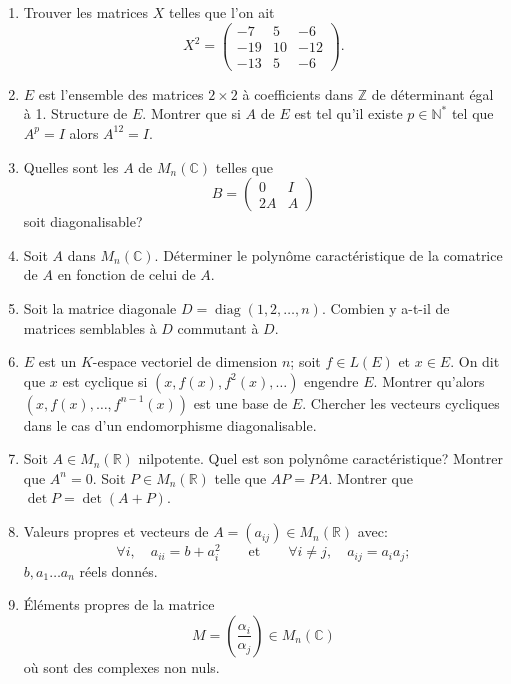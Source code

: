 \begin{enumerate}[label=\arabic*.,leftmargin=2.2em,itemsep=1.0em]
\item Trouver les matrices $X$ telles que l'on ait
\[
X^2=\begin{pmatrix}
-7&5&-6\\
-19&10&-12\\
-13&5&-6
\end{pmatrix}.
\]

\item $E$ est l'ensemble des matrices $2\times2$ à coefficients dans $\mathbb Z$ de déterminant égal à 1. Structure de $E$. Montrer que si $A$ de $E$ est tel qu'il existe $p\in\mathbb N^*$ tel que $A^p=I$ alors $A^{12}=I$.

\item Quelles sont les $A$ de $M_n(\mathbb C)$ telles que
\[
B=\begin{pmatrix}0&I\\2A&A\end{pmatrix}
\]
soit diagonalisable?

\item Soit $A$ dans $M_n(\mathbb C)$. Déterminer le polynôme caractéristique de la comatrice de $A$ en fonction de celui de $A$.

\item Soit la matrice diagonale $D=\operatorname{diag}(1,2,\ldots,n)$. Combien y a-t-il de matrices semblables à $D$ commutant à $D$.

\item $E$ est un $K$-espace vectoriel de dimension $n$; soit $f\in L(E)$ et $x\in E$. On dit que $x$ est cyclique si $(x,f(x),f^2(x),\ldots)$ engendre $E$. Montrer qu'alors $(x,f(x),\ldots,f^{n-1}(x))$ est une base de $E$. Chercher les vecteurs cycliques dans le cas d'un endomorphisme diagonalisable.

\item Soit $A\in M_n(\mathbb R)$ nilpotente. Quel est son polynôme caractéristique? Montrer que $A^n=0$. Soit $P\in M_n(\mathbb R)$ telle que $AP=PA$. Montrer que $\det P=\det(A+P)$.

\item Valeurs propres et vecteurs de $A=(a_{ij})\in M_n(\mathbb R)$ avec:
\[
\forall i,\quad a_{ii}=b+a_i^2
\qquad\text{et}\qquad
\forall i\ne j,\quad a_{ij}=a_i a_j;
\]
$b,a_1\ldots a_n$ réels donnés.

\enlargethispage{3pt}
\item Éléments propres de la matrice
\[
M=\left(\frac{\alpha_i}{\alpha_j}\right)\in M_n(\mathbb C)
\]
où  sont des complexes non nuls.


\end{enumerate}
